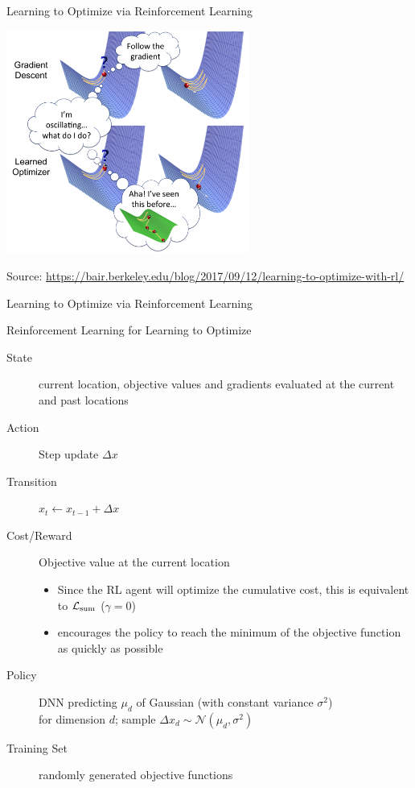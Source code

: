 \begin{frame}[c]{Learning to Optimize via Reinforcement Learning\newline {}}

\centering
\includegraphics[width=0.6\textwidth]{images/l2o_comic}

\tiny
Source: \url{https://bair.berkeley.edu/blog/2017/09/12/learning-to-optimize-with-rl/}

\end{frame}
\begin{frame}[c]{Learning to Optimize via Reinforcement Learning\newline {}}

\begin{block}{Reinforcement Learning for Learning to Optimize}
\begin{description}
\item[State] current location, objective values and gradients evaluated at the current and past locations
\pause
\item[Action] Step update $\Delta x$
\pause
\item[Transition] $x_t \leftarrow x_{t-1} + \Delta x$
\pause
\item[Cost/Reward] Objective value at the current location
\begin{itemize}
\item Since the RL agent will optimize the cumulative cost, this is equivalent to $\mathcal{L}_{\text{sum}}$  ($\gamma=0$)
\item encourages the policy to reach the minimum of the objective function as quickly as possible
\end{itemize}
\pause
\item[Policy] DNN predicting $\mu_d$ of Gaussian (with constant variance $\sigma^2$)\\ for dimension $d$; sample $\Delta x_d \sim \mathcal{N}(\mu_d, \sigma^2)$
\pause
\item[Training Set] randomly generated objective functions
\end{description}
\end{block}

\end{frame}
